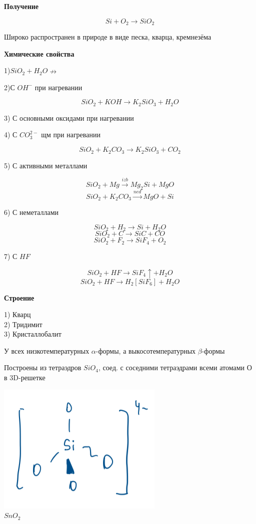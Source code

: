 \documentclass[14pt,a4paper]{scrartcl}
\begin{document}
\textbf{Получение}

$$Si + O_2 \rightarrow SiO_2$$

Широко распространен в природе в виде песка, кварца, кремнезёма

\textbf{Химические свойства}

1)$SiO_2 + H_2O \nrightarrow$

2)С $OH^-$ при нагревании

$$SiO_2 + KOH \rightarrow K_2SiO_3 + H_2O$$

3) С основными оксидами при нагревании

4) С $CO_3^{2-}$ щм при нагревании

$$SiO_2 + K_2CO_3 \rightarrow K_2SiO_3 + CO_2$$

5) С активными металлами

$$SiO_2 + Mg \xrightarrow{izb} Mg_2Si + MgO$$
$$SiO_2 + K_2CO_3 \xrightarrow{ned} MgO + Si$$

6) С неметаллами

$$SiO_2 + H_2 \rightarrow Si + H_2O$$
$$SiO_2 + C \rightarrow SiC + CO$$
$$SiO_2 + F_2 \rightarrow SiF_4+ O_2$$

7) С $HF$

$$SiO_2 + HF \rightarrow SiF_4\uparrow + H_2O$$
$$SiO_2 + HF \rightarrow H_2[SiF_6] + H_2O$$

\textbf{Строение}

1) Кварц\\
2) Тридимит\\
3) Кристаллобалит

У всех низкотемпературных $\alpha$-формы, а выкосотемпературных $\beta$-формы

Построены из тетраэдров $SiO_4$, соед. с соседними тетраэдрами всеми атомами О в 3D-решетке

\includegraphics{10v6.png}\\

$SnO_2$
\end{document}
